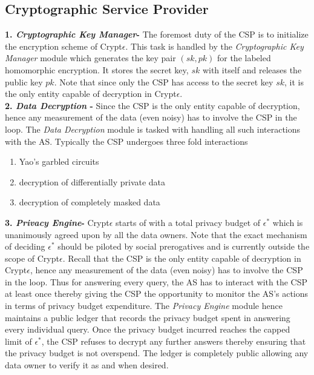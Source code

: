 \subsection*{Cryptographic Service Provider}
\textbf{1. \textit{ Cryptographic Key Manager}-} The foremost duty of the CSP is to initialize the encryption scheme of Crypt$\epsilon$. This task is handled by the \textit{Cryptographic Key Manager} module which generates the key pair $(sk,pk)$ for the labeled homomorphic encryption. It stores the secret key, $sk$ with itself and releases the public key $pk$. Note that since only the CSP has access to the secret key $sk$, it is the only entity capable of decryption in Crypt$\epsilon$.\\\textbf{2. \textit{ Data Decryption} - } Since the CSP is the only entity capable of decryption, hence any measurement of the data (even noisy) has to involve the CSP in the loop. The \textit{Data Decryption} module is tasked with handling all such interactions with the AS. Typically the CSP undergoes three fold interactions \begin{enumerate}\item Yao's garbled circuits \item decryption of differentially private data \item decryption of completely masked data \end{enumerate}
\textbf{3. \textit{ Privacy Engine}-} Crypt$\epsilon$ starts of with a total privacy budget of $\epsilon^*$ which is unanimously agreed upon by all the data owners. Note that the exact mechanism of deciding $\epsilon^*$ should be piloted by social prerogatives and is currently outside the scope of Crypt$\epsilon$. Recall that the CSP is the only entity capable of decryption in Crypt$\epsilon$, hence any measurement of the data (even noisy) has to involve the CSP in the loop.  Thus for answering every query, the AS has to interact with the CSP at least once thereby giving the CSP the opportunity to monitor the AS's actions in terms of privacy budget expenditure. The \textit{Privacy Engine} module hence maintains a public ledger that records the privacy budget spent in answering every individual query. Once the privacy budget incurred reaches the capped limit of $\epsilon^*$, the CSP refuses to decrypt any further answers thereby ensuring that the privacy budget is not overspend.  The ledger is completely public allowing any data owner to verify it as and when desired.
